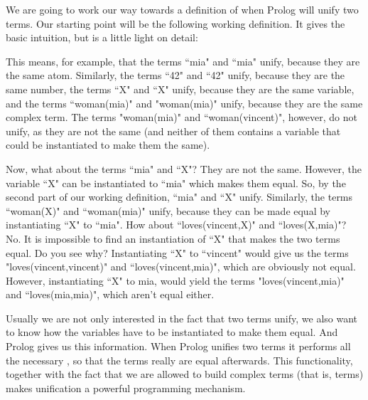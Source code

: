 We are  going to work our way towards a  definition of when
Prolog will unify two terms.  Our starting point will be the following
working definition. It gives the basic intuition, but is a little
light on detail:
%
\begin{center}\parbox{0.9\textwidth}{
}
\end{center}
%
This means, for example, that the terms ``mia" and ``mia" unify, because
they are the same atom. Similarly, the terms ``42" and ``42" unify,
because they are the same number, the terms ``X" and ``X" unify, because
they are the same variable, and the terms ``woman(mia)" and
"woman(mia)" unify, because they are the same complex term. The terms
"woman(mia)" and ``woman(vincent)", however, do not unify, as they are
not the same (and neither of them contains a variable that could be
instantiated to make them the same).

Now, what about the terms ``mia" and ``X"? They are not the same.
However, the variable ``X" can be instantiated to ``mia" which makes
them equal. So, by the second part of our working definition, ``mia"
and ``X" unify. Similarly, the terms ``woman(X)" and ``woman(mia)" unify,
because they can be made equal by instantiating ``X" to ``mia". How
about ``loves(vincent,X)" and ``loves(X,mia)"? No. It is impossible to
find an instantiation of ``X" that makes the two terms equal. Do you
see why?  Instantiating ``X" to ``vincent" would give us the terms
"loves(vincent,vincent)" and ``loves(vincent,mia)", which are obviously
not equal. However, instantiating ``X" to mia, would yield the terms
"loves(vincent,mia)" and ``loves(mia,mia)", which aren't equal either.

Usually we are not only interested in the fact that two terms unify,
we also want to know how the variables have to be instantiated to make
them equal. And Prolog gives us this information.  When
Prolog unifies two terms it performs all the necessary ,
so that the terms really are equal afterwards. This functionality,
together with the fact that we are allowed to build complex terms
(that is,  terms) makes unification a
powerful programming mechanism.

